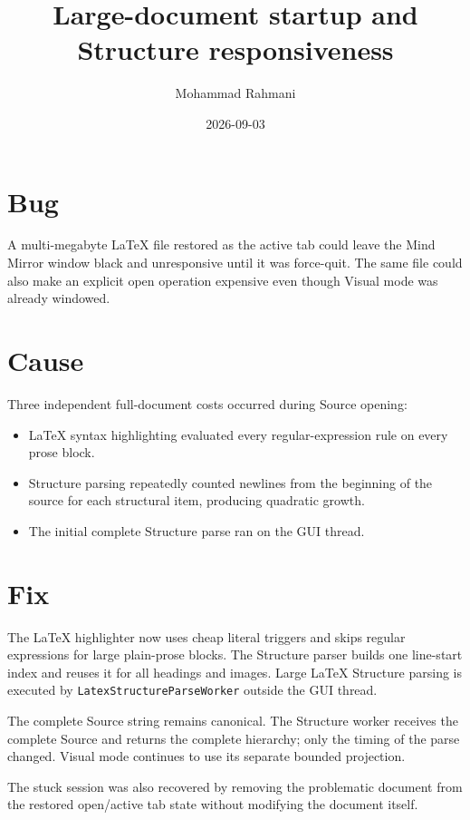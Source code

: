 \documentclass[a4paper]{article}
\title{Large-document startup and Structure responsiveness}
\date{2026-09-03}
\author{Mohammad Rahmani}
\begin{document}
\maketitle

\section{Bug}
A multi-megabyte LaTeX file restored as the active tab could leave the Mind
Mirror window black and unresponsive until it was force-quit. The same file
could also make an explicit open operation expensive even though Visual mode
was already windowed.

\section{Cause}
Three independent full-document costs occurred during Source opening:
\begin{itemize}
    \item LaTeX syntax highlighting evaluated every regular-expression rule on every prose block.
    \item Structure parsing repeatedly counted newlines from the beginning of the source for each structural item, producing quadratic growth.
    \item The initial complete Structure parse ran on the GUI thread.
\end{itemize}

\section{Fix}
The LaTeX highlighter now uses cheap literal triggers and skips regular
expressions for large plain-prose blocks. The Structure parser builds one
line-start index and reuses it for all headings and images. Large LaTeX
Structure parsing is executed by \texttt{LatexStructureParseWorker} outside
the GUI thread.

The complete Source string remains canonical. The Structure worker receives
the complete Source and returns the complete hierarchy; only the timing of the
parse changed. Visual mode continues to use its separate bounded projection.

The stuck session was also recovered by removing the problematic document
from the restored open/active tab state without modifying the document itself.
\end{document}
